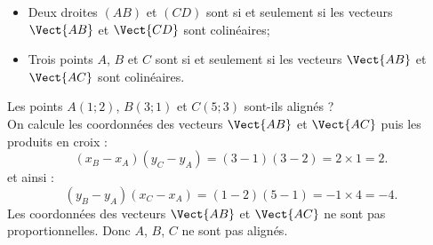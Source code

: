 \documentclass{book}
\begin{document}
\begin{Proposition}
\begin{itemize}
\item Deux droites $(AB)$ et $(CD)$ sont  si et seulement si les vecteurs $\Vect{AB}$ et $\Vect{CD}$ sont colinéaires;
\item Trois points $A$, $B$ et $C$ sont  si et seulement si les vecteurs $\Vect{AB}$ et $\Vect{AC}$ sont colinéaires.
\end{itemize}
\end{Proposition}
\begin{Exemple}
Les points $A(1;2 )$, $B(3;1 )$ et $C(5; 3)$  sont-ils alignés ?\\
On calcule les coordonnées des vecteurs $\Vect{AB}$ et $\Vect{AC}$ puis les produits en croix :
$$(x_B-x_A)(y_C-y_A)=(3-1)(3-2)=2\times 1=2.$$
et ainsi : \\
$$(y_B-y_A)(x_C-x_A)=(1-2)(5-1)=-1\times4=-4.$$
Les coordonnées des vecteurs $\Vect{AB}$ et $\Vect{AC}$ ne sont pas proportionnelles. Donc $A$, $B$, $C$ ne sont pas alignés.
\end{Exemple}
\end{document}
